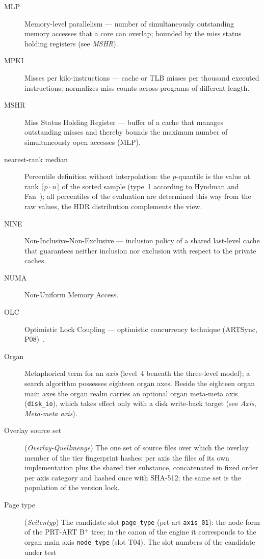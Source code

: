 \begin{description}
  \item[MLP] Memory-level parallelism --- number of simultaneously outstanding memory accesses that
  a core can overlap; bounded by the miss status holding registers (see \emph{MSHR}).
  \item[MPKI] Misses per kilo-instructions --- cache or TLB misses per thousand executed
  instructions; normalizes miss counts across programs of different length.
  \item[MSHR] Miss Status Holding Register --- buffer of a cache that manages outstanding misses
  and thereby bounds the maximum number of simultaneously open accesses (MLP).
  \item[nearest-rank median] Percentile definition without interpolation: the $p$-quantile is the
  value at rank $\lceil p \cdot n \rceil$ of the sorted sample (type~1 according to Hyndman and
  Fan~\cite{hyndman1996quantiles}); all percentiles of the evaluation are determined this way from
  the raw values, the HDR distribution complements the view.
  \item[NINE] Non-Inclusive-Non-Exclusive --- inclusion policy of a shared last-level cache that
  guarantees neither inclusion nor exclusion with respect to the private caches.
  \item[NUMA] Non-Uniform Memory Access.
  \item[OLC] Optimistic Lock Coupling --- optimistic concurrency technique (ARTSync,
  P08)~\cite{leis2016olc}.
  \item[Organ] Metaphorical term for an \emph{axis} (level~4 beneath the three-level model); a search
  algorithm possesses eighteen organ axes. Beside the eighteen organ main axes the organ realm
  carries an optional organ meta-meta axis (\texttt{disk\_io}), which takes effect only with a disk
  write-back target (see \emph{Axis}, \emph{Meta-meta axis}).
  \item[Overlay source set] (\emph{Overlay-Quellmenge}) The one set of source files over which the
  overlay member of the tier fingerprint hashes: per axis the files of its own implementation plus
  the shared tier substance, concatenated in fixed order per axis category and hashed once with
  SHA-512; the same set is the population of the version lock.
  \item[Page type] (\emph{Seitentyp}) The candidate slot \texttt{page\_type} (prt-art
  \texttt{axis\_01}): the node form of the PRT-ART B$^+$ tree; in the canon of the engine it
  corresponds to the organ main axis \texttt{node\_type} (slot T04). The slot numbers of the candidate under test

\end{description}
